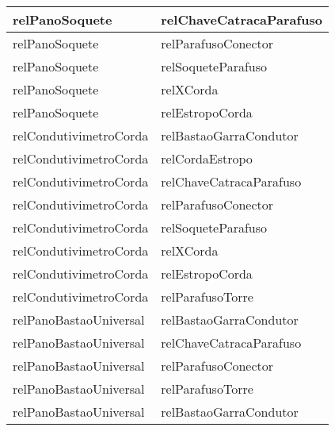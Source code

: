 \begin{center}
\begin{longtable}[H]{|l|l|}
relPanoSoquete                                  & relChaveCatracaParafuso                          \\ \hline
relPanoSoquete                                  & relParafusoConector                              \\ \hline
relPanoSoquete                                  & relSoqueteParafuso                               \\ \hline
relPanoSoquete                                  & relXCorda                                        \\ \hline
relPanoSoquete                                  & relEstropoCorda                                  \\ \hline
relCondutivimetroCorda                          & relBastaoGarraCondutor                           \\ \hline
relCondutivimetroCorda                          & relCordaEstropo                                  \\ \hline
relCondutivimetroCorda                          & relChaveCatracaParafuso                          \\ \hline
relCondutivimetroCorda                          & relParafusoConector                              \\ \hline
relCondutivimetroCorda                          & relSoqueteParafuso                               \\ \hline
relCondutivimetroCorda                          & relXCorda                                        \\ \hline
relCondutivimetroCorda                          & relEstropoCorda                                  \\ \hline
relCondutivimetroCorda                          & relParafusoTorre                                 \\ \hline
relPanoBastaoUniversal                          & relBastaoGarraCondutor                           \\ \hline
relPanoBastaoUniversal                          & relChaveCatracaParafuso                          \\ \hline
relPanoBastaoUniversal                          & relParafusoConector                              \\ \hline
relPanoBastaoUniversal                          & relParafusoTorre                                 \\ \hline
relPanoBastaoUniversal                          & relBastaoGarraCondutor                           \\ \hline

\end{longtable}
\end{center}
